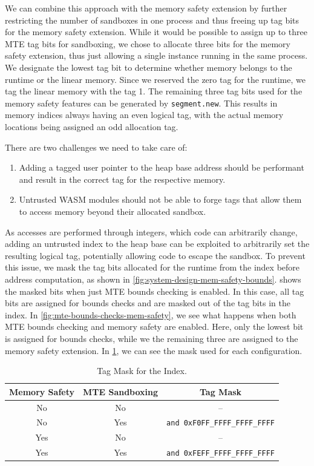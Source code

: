 We can combine this approach with the memory safety extension by further restricting the number of sandboxes in one process and thus freeing up tag bits for the memory safety extension.
While it would be possible to assign up to three \ac{MTE} tag bits for sandboxing, we chose to allocate three bits for the memory safety extension, thus just allowing a single instance running in the same process.
We designate the lowest tag bit to determine whether memory belongs to the runtime or the linear memory.
Since we reserved the zero tag for the runtime, we tag the linear memory with the tag 1.
The remaining three tag bits used for the memory safety features can be generated by \texttt{segment.new}.
This results in memory indices always having an even logical tag, with the actual memory locations being assigned an odd allocation tag.

There are two challenges we need to take care of:
\begin{enumerate}
  \item Adding a tagged user pointer to the heap base address should be performant and result in the correct tag for the respective memory.
  \item Untrusted \ac{WASM} modules should not be able to forge tags that allow them to access memory beyond their allocated sandbox.
\end{enumerate}

As accesses are performed through integers, which code can arbitrarily change, adding an untrusted index to the heap base can be exploited to arbitrarily set the resulting logical tag, potentially allowing code to escape the sandbox.
To prevent this issue, we mask the tag bits allocated for the runtime from the index before address computation, as shown in \cref{fig:system-design-mem-safety-bounds}.
 shows the masked bits when just \ac{MTE} bounds checking is enabled.
In this case, all tag bits are assigned for bounds checks and are masked out of the tag bits in the index.
In \cref{fig:mte-bounds-checks-mem-safety}, we see what happens when both \ac{MTE} bounds checking and memory safety are enabled.
Here, only the lowest bit is assigned for bounds checks, while we the remaining three are assigned to the memory safety extension.
In \cref{tab:tag-mask}, we can see the mask used for each configuration.

\begin{table}
  \centering
  \begin{tabular}{c | c || c}
    \textbf{Memory Safety} & \textbf{MTE Sandboxing} & \textbf{Tag Mask} \\
    \hline
    No  & No  & -- \\
    No  & Yes & \texttt{and 0xF0FF\_FFFF\_FFFF\_FFFF} \\
    Yes & No  & -- \\
    Yes & Yes & \texttt{and 0xFEFF\_FFFF\_FFFF\_FFFF}
  \end{tabular}
  \caption{Tag Mask for the Index.}
  \label{tab:tag-mask}
\end{table}

